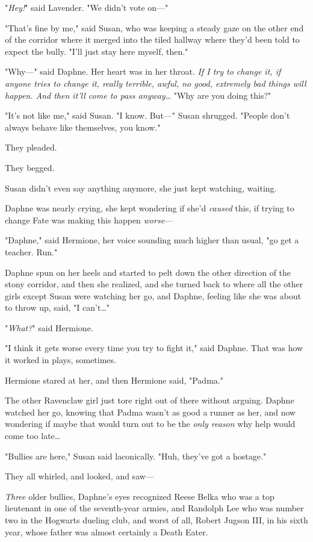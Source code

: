 "\emph{Hey!}" said Lavender. "We didn't vote on---"

"That's fine by me," said Susan, who was keeping a steady gaze on the other end 
of the corridor where it merged into the tiled hallway where they'd been told 
to expect the bully. "I'll just stay here myself, then."

"Why---" said Daphne. Her heart was in her throat. \emph{If I try to change it, 
if \emph{anyone} tries to change it, really terrible, awful, no good, extremely 
bad things will happen. And then it'll come to pass anyway{\ldots}} "Why are 
you doing this?"

"It's not like me," said Susan. "I know. But---" Susan shrugged. "People don't 
always behave like themselves, you know."

They pleaded.

They begged.

Susan didn't even say anything anymore, she just kept watching, waiting.

Daphne was nearly crying, she kept wondering if she'd \emph{caused} this, if 
trying to change Fate was making this happen \emph{worse}---

"Daphne," said Hermione, her voice sounding much higher than usual, "go get a 
teacher. Run."

Daphne spun on her heels and started to pelt down the other direction of the 
stony corridor, and then she realized, and she turned back to where all the 
other girls except Susan were watching her go, and Daphne, feeling like she was 
about to throw up, said, "I can't{\ldots}"

"\emph{What?}" said Hermione.

"I think it gets worse every time you try to fight it," said Daphne. That was 
how it worked in plays, sometimes.

Hermione stared at her, and then Hermione said, "Padma."

The other Ravenclaw girl just tore right out of there without arguing. Daphne 
watched her go, knowing that Padma wasn't as good a runner as her, and now 
wondering if maybe that would turn out to be the \emph{only reason} why help 
would come too late{\ldots}

"Bullies are here," Susan said laconically. "Huh, they've got a hostage."

They all whirled, and looked, and saw---

\emph{Three} older bullies, Daphne's eyes recognized Reese Belka who was a top 
lieutenant in one of the seventh-year armies, and Randolph Lee who was number 
two in the Hogwarts dueling club, and worst of all, Robert Jugson III, in his 
sixth year, whose father was almost certainly a Death Eater.

